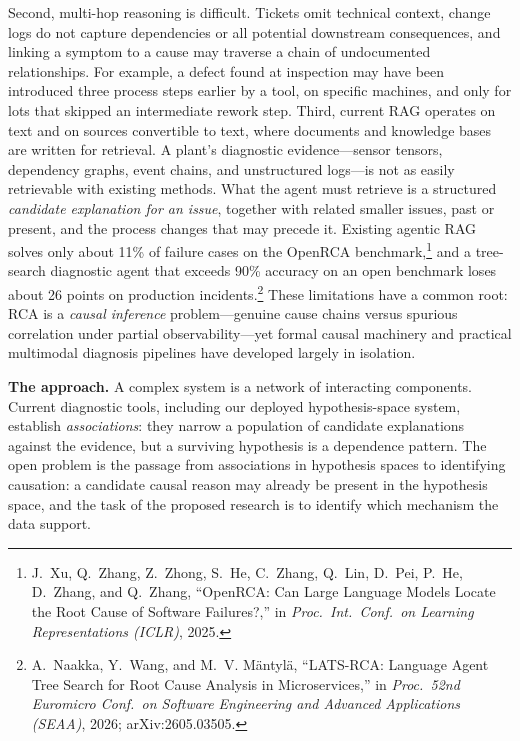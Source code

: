 \documentclass[12pt]{article}
\begin{document}
Second, multi-hop reasoning is difficult. Tickets omit technical context, change logs do not capture dependencies or all potential downstream consequences, and linking a symptom to a cause may traverse a chain of undocumented relationships. For example, a defect found at inspection may have been introduced three process steps earlier by a tool, on specific machines, and only for lots that skipped an intermediate rework step. Third, current RAG operates on text and on sources convertible to text, where documents and knowledge bases are written for retrieval. A plant's diagnostic evidence---sensor tensors, dependency graphs, event chains, and unstructured logs---is not as easily retrievable with existing methods. What the agent must retrieve is a structured \emph{candidate explanation for an issue}, together with related smaller issues, past or present, and the process changes that may precede it. Existing agentic RAG solves only about 11\% of failure cases on the OpenRCA benchmark,\footnote{J.~Xu, Q.~Zhang, Z.~Zhong, S.~He, C.~Zhang, Q.~Lin, D.~Pei, P.~He, D.~Zhang, and Q.~Zhang, ``OpenRCA: Can Large Language Models Locate the Root Cause of Software Failures?,'' in \emph{Proc.\ Int.\ Conf.\ on Learning Representations (ICLR)}, 2025.} and a tree-search diagnostic agent that exceeds 90\% accuracy on an open benchmark loses about 26 points on production incidents.\footnote{A.~Naakka, Y.~Wang, and M.~V. M\"{a}ntyl\"{a}, ``LATS-RCA: Language Agent Tree Search for Root Cause Analysis in Microservices,'' in \emph{Proc.\ 52nd Euromicro Conf.\ on Software Engineering and Advanced Applications (SEAA)}, 2026; arXiv:2605.03505.} These limitations have a common root: RCA is a \emph{causal inference} problem---genuine cause chains versus spurious correlation under partial observability---yet formal causal machinery and practical multimodal diagnosis pipelines have developed largely in isolation.



\noindent
\textbf{The approach.} A complex system is a network of interacting components. Current diagnostic tools, including our deployed hypothesis-space system, establish \emph{associations}: they narrow a population of candidate explanations against the evidence, but a surviving hypothesis is a dependence pattern. The open problem is the passage from associations in hypothesis spaces to identifying causation: a candidate causal reason may already be present in the hypothesis space, and the task of the proposed research is to identify which mechanism the data support.
\end{document}
